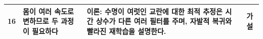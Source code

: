 {\begin{longtable}{>{\raggedright}p{0.5cm}>{\raggedright}p{4.0cm}>{\raggedright}p{5.6cm}>{\raggedright}p{2.3cm}>{\raggedright\arraybackslash}p{1.7cm}}
16 & 몸이 여러 속도로 변하므로 두 과정이 필요하다 & 이론: 수명이 여럿인 교란에 대한 최적 추정은 시간 상수가 다른 여러 필터를 주며, 자발적 복귀와 빨라진 재학습을 설명한다. & \cite{Kording2007} & 가설 \\
\bottomrule
\end{longtable}}
